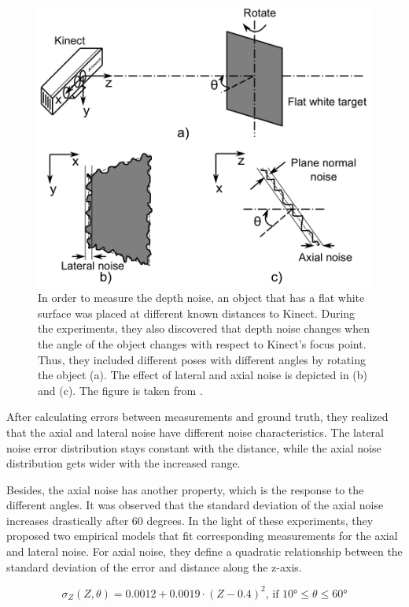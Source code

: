 \documentclass[a4paper]{report}
\numberwithin{figure}{section}
\begin{document}
\begin{figure}[H] \centering
\includegraphics[width=0.7\linewidth,natwidth=640,natheight=640]
{fig/ref_imgs/kinect_noise_experiment.png} \caption[Kinect's Depth Noise
Experiment]{In order to measure the depth noise, an object that has a flat 
white
surface was placed at different known distances to Kinect. During the
experiments, they also discovered that depth noise changes when the angle of
the object changes with respect to Kinect's focus point. Thus, they included
different poses with different angles by rotating the object (a).  The effect
of lateral and axial noise is depicted in (b) and (c).  The figure is taken
from \parencite{Nguyen2012a}.} \label{fig:kinect_noise_experiment} \end{figure}

After calculating errors between measurements and ground truth, they realized
that the axial and lateral noise have different noise characteristics. The
lateral noise error distribution stays constant with the distance, while the
axial noise distribution gets wider with the increased range.

Besides, the axial noise has another property, which is the response to the
different angles. It was observed that the standard deviation of the axial
noise increases drastically after 60 degrees.  In the light of these
experiments, they proposed two empirical models that fit corresponding
measurements for the axial and lateral noise.  For axial noise, they define a
quadratic relationship between the standard deviation of the error and distance
along the z-axis. 

\begin{equation}\label{eq:depth_noise_model} \sigma_Z (Z,\theta) = 0.0012 +
0.0019 \cdot (Z-0.4)^2 \text{, if } \ang{10}\leq \theta \leq \ang{60}
\end{equation}
\end{document}
